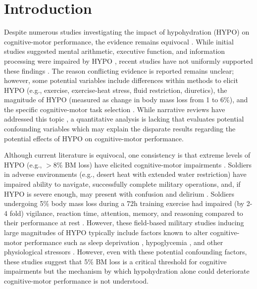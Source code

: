 \section{Introduction}
Despite numerous studies investigating the impact of hypohydration (HYPO) on cognitive-motor performance, the evidence remains equivocal \cite{grandjean_dehydration_2007,masento_effects_2014,lieberman_hydration_2007,wilson_impaired_2003}. While initial studies suggested mental arithmetic, executive function, and information processing were impaired by HYPO \cite{gopinathan_role_1988, sharma_influence_1986}, recent studies have not uniformly supported these findings \cite{adam_hydration_2008, ely_hypohydration_2013}. The reason conflicting evidence is reported remains unclear; however, some potential variables include differences within methods to elicit HYPO (e.g., exercise, exercise-heat stress, fluid restriction, diuretics), the magnitude of HYPO (measured as change in body mass loss from 1 to 6\%), and the specific cognitive-motor task selection \cite{lieberman_hydration_2007, lieberman_methods_2012,masento_effects_2014}. While narrative reviews have addressed this topic \cite{masento_effects_2014, lieberman_methods_2012, grandjean_dehydration_2007}, a quantitative analysis is lacking that evaluates potential confounding variables which may explain the disparate results regarding the potential effects of HYPO on cognitive-motor performance. 

Although current literature is equivocal, one consistency is that extreme levels of HYPO (e.g., $>$8\% BM loss) have elicited cognitive-motor impairments \cite{king_brief_1878, adolf_physiology_1947}. Soldiers in adverse environments (e.g., desert heat with extended water restriction) have impaired ability to navigate, successfully complete military operations, and, if HYPO is severe enough, may present with confusion and delirium \cite{king_brief_1878,adolf_physiology_1947}. Soldiers undergoing 5\% body mass loss during a 72h training exercise had impaired (by 2-4 fold) vigilance, reaction time, attention, memory, and reasoning compared to their performance at rest \cite{lieberman_severe_2005}. However, these field-based military studies inducing large magnitudes of HYPO typically include factors known to alter cognitive-motor performance such as sleep deprivation \cite{krause_sleep-deprived_2017}, hypoglycemia \cite{strachan_acute_2001}, and other physiological stressors \cite{opstad_performance_1978}. However, even with these potential confounding factors, these studies suggest that 5\% BM loss is a critical threshold for cognitive impairments but the mechanism by which hypohydration alone could deteriorate cognitive-motor performance is not understood. 

